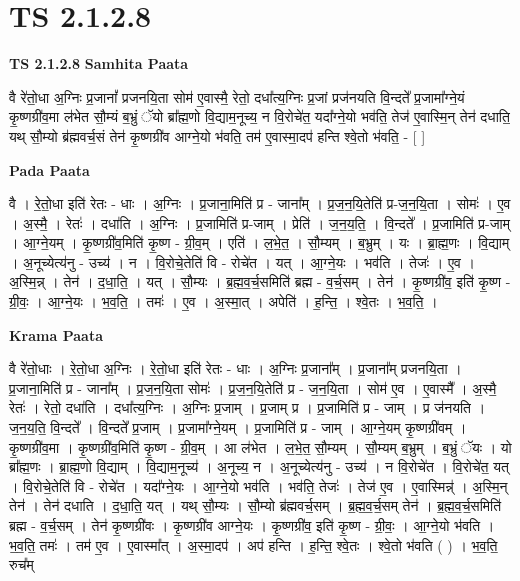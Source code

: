 \documentclass[17pt]{extarticle}
\begin{document}
\section*{ TS 2.1.2.8 }

\textbf{TS 2.1.2.8 } \newline
\textbf{Samhita Paata} \newline

वै रे॑तो॒धा अ॒ग्निः प्र॒जानां᳚ प्रजनयि॒ता सोम॑ ए॒वास्मै॒ रेतो॒ दधा᳚त्य॒ग्निः प्र॒जां प्रज॑नयति वि॒न्दते᳚ प्र॒जामा᳚ग्ने॒यं कृ॒ष्णग्री॑व॒मा ल॑भेत सौ॒म्यं ब॒भ्रुं ॅयो ब्रा᳚ह्म॒णो वि॒द्याम॒नूच्य॒ न वि॒रोचे॑त॒ यदा᳚ग्ने॒यो भव॑ति॒ तेज॑ ए॒वास्मि॒न् तेन॑ दधाति॒ यथ् सौ॒म्यो ब्र॑ह्मवर्च॒सं तेन॑ कृ॒ष्णग्री॑व आग्ने॒यो भ॑वति॒ तम॑ ए॒वास्मा॒दप॑ हन्ति श्वे॒तो भ॑वति॒ - [  ] \newline

\textbf{Pada Paata} \newline

वै । रे॒तो॒धा इति॑ रेतः - धाः । अ॒ग्निः । प्र॒जाना॒मिति॑ प्र - जाना᳚म् । प्र॒ज॒न॒यि॒तेति॑ प्र-ज॒न॒यि॒ता । सोमः॑ । ए॒व । अ॒स्मै॒ । रेतः॑ । दधा॑ति । अ॒ग्निः । प्र॒जामिति॑ प्र-जाम् । प्रेति॑ । ज॒न॒य॒ति॒ । वि॒न्दते᳚ । प्र॒जामिति॑ प्र-जाम् । आ॒ग्ने॒यम् । कृ॒ष्णग्री॑व॒मिति॑ कृ॒ष्ण - ग्री॒व॒म् । एति॑ । ल॒भे॒त॒ । सौ॒म्यम् । ब॒भ्रुम् । यः । ब्रा॒ह्म॒णः । वि॒द्याम् । अ॒नूच्येत्य॑नु - उच्य॑ । न । वि॒रोचे॒तेति॑ वि - रोचे॑त । यत् । आ॒ग्ने॒यः । भव॑ति । तेजः॑ । ए॒व । अ॒स्मि॒न्न् । तेन॑ । द॒धा॒ति॒ । यत् । सौ॒म्यः । ब्र॒ह्म॒व॒र्च॒समिति॑ ब्रह्म - व॒र्च॒सम् । तेन॑ । कृ॒ष्णग्री॑व॒ इति॑ कृ॒ष्ण - ग्री॒वः॒ । आ॒ग्ने॒यः । भ॒व॒ति॒ । तमः॑ । ए॒व । अ॒स्मा॒त् । अपेति॑ । ह॒न्ति॒ । श्वे॒तः । भ॒व॒ति॒ ।  \newline


\textbf{Krama Paata} \newline

वै रे॑तो॒धाः । रे॒तो॒धा अ॒ग्निः । रे॒तो॒धा इति॑ रेतः - धाः । अ॒ग्निः प्र॒जाना᳚म् । प्र॒जाना᳚म् प्रजनयि॒ता । प्र॒जाना॒मिति॑ प्र - जाना᳚म् । प्र॒ज॒न॒यि॒ता सोमः॑ । प्र॒ज॒न॒यि॒तेति॑ प्र - ज॒न॒यि॒ता । सोम॑ ए॒व । ए॒वास्मै᳚ । अ॒स्मै॒ रेतः॑ । रेतो॒ दधा॑ति । दधा᳚त्य॒ग्निः । अ॒ग्निः प्र॒जाम् । प्र॒जाम् प्र । प्र॒जामिति॑ प्र - जाम् । प्र ज॑नयति । ज॒न॒य॒ति॒ वि॒न्दते᳚ । वि॒न्दते᳚ प्र॒जाम् । प्र॒जामा᳚ग्ने॒यम् । प्र॒जामिति॑ प्र - जाम् । आ॒ग्ने॒यम् कृ॒ष्णग्री॑वम् । कृ॒ष्णग्री॑व॒मा । कृ॒ष्णग्री॑व॒मिति॑ कृ॒ष्ण - ग्री॒व॒म् । आ ल॑भेत । ल॒भे॒त॒ सौ॒म्यम् । सौ॒म्यम् ब॒भ्रुम् । ब॒भ्रुं ॅयः । यो ब्रा᳚ह्म॒णः । ब्रा॒ह्म॒णो वि॒द्याम् । वि॒द्याम॒नूच्य॑ । अ॒नूच्य॒ न । अ॒नूच्येत्य॑नु - उच्य॑ । न वि॒रोचे॑त । वि॒रोचे॑त॒ यत् । वि॒रोचे॒तेति॑ वि - रोचे॑त । यदा᳚ग्ने॒यः । आ॒ग्ने॒यो भव॑ति । भव॑ति॒ तेजः॑ । तेज॑ ए॒व । ए॒वास्मिन्न्॑ । अ॒स्मि॒न् तेन॑ । तेन॑ दधाति । द॒धा॒ति॒ यत् । यथ् सौ॒म्यः । सौ॒म्यो ब्र॑ह्मवर्च॒सम् । ब्र॒ह्म॒व॒र्च॒सम् तेन॑ । ब्र॒ह्म॒व॒र्च॒समिति॑ ब्रह्म - व॒र्च॒सम् । तेन॑ कृ॒ष्णग्री॑वः । कृ॒ष्णग्री॑व आग्ने॒यः । कृ॒ष्णग्री॑व॒ इति॑ कृ॒ष्ण - ग्री॒वः॒ । आ॒ग्ने॒यो भ॑वति । भ॒व॒ति॒ तमः॑ । तम॑ ए॒व । ए॒वास्मा᳚त् । अ॒स्मा॒दप॑ । अप॑ हन्ति । ह॒न्ति॒ श्वे॒तः । श्वे॒तो भ॑वति ( ) । भ॒व॒ति॒ रुच᳚म् \newline
\end{document}
